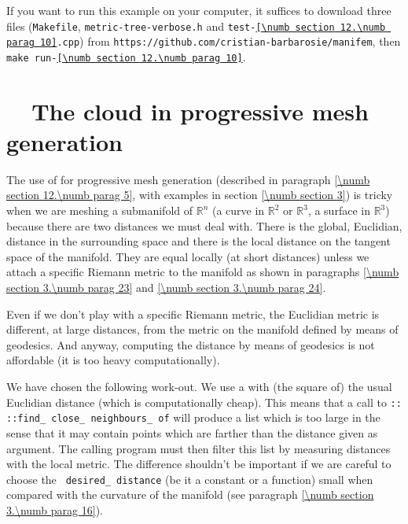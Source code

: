 If you want to run this example on your computer, it suffices to download three files
({\small\tt Makefile}, {\small\tt metric-tree-verbose.h} and
{\small\tt test-\ref{\numb section 12.\numb parag 10}.cpp}) from\hfil\break
{\small\tt https://github.com/cristian-barbarosie/manifem},\hfil\break
then {\small\tt make run-\ref{\numb section 12.\numb parag 10}}.


\section{~~The cloud in progressive mesh generation}\label{\numb section 12.\numb parag 11}

The use of {\small\tt{}} for progressive mesh generation (described in paragraph
\ref{\numb section 12.\numb parag 5}, with examples in section \ref{\numb section 3})
is tricky when we are meshing a submanifold of $ \mathbb{R}^n $
(a curve in $ \mathbb{R}^2 $ or $ \mathbb{R}^3 $, a surface in $ \mathbb{R}^3 $)
because there are two distances we must deal with.
There is the global, Euclidian, distance in the surrounding space
and there is the local distance on the tangent space of the manifold.
They are equal locally (at short distances) unless we attach a specific Riemann metric
to the manifold as shown in paragraphs \ref{\numb section 3.\numb parag 23} and
\ref{\numb section 3.\numb parag 24}.

Even if we don't play with a specific Riemann metric, the Euclidian metric is different,
at large distances, from the metric on the manifold defined by means of geodesics.
And anyway, computing the distance by means of geodesics is not affordable (it is too heavy
computationally).

We have chosen the following work-out.
We use a {\small\tt{}} with (the square of) the usual Euclidian distance
(which is computationally cheap).
This means that a call to {\small\tt{}:: ::find\_\,close\_\,neighbours\_\,of}
will produce a list which is too large in the sense that it may contain points which are
farther than the distance given as argument.
The calling program must then filter this list by measuring distances with the local metric.
The difference shouldn't be important if we are careful to choose the {\small\tt
desired\_\,distance} (be it a constant or a function) small when compared with the curvature
of the manifold (see paragraph \ref{\numb section 3.\numb parag 16}).

